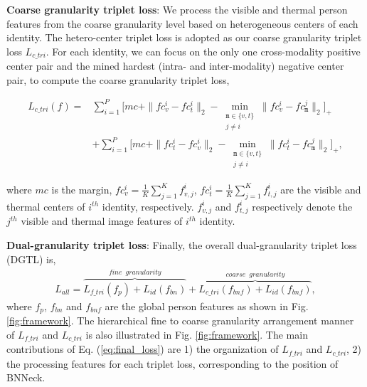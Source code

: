 \documentclass[journal]{IEEEtran}
\begin{document}
\textbf{Coarse granularity triplet loss}: We process the visible and thermal person features from the coarse granularity level based on heterogeneous centers of each identity. The hetero-center triplet loss \cite{Liu2020ParametersSE} is adopted as our coarse granularity triplet loss $L_{c\_tri}$. For each identity, we can focus on the only one cross-modality positive center pair and the mined hardest (intra- and inter-modality) negative center pair, to compute the coarse granularity triplet loss,
\begin{small}
\begin{align}\label{eq:loss_ct}
    L_{c\_tri}(f) = & \sum\limits_{i=1}^{P}\Big[mc  +  \|fc^i_v - fc^i_t\|_2  - \min\limits_{\substack{ \texttt{m} \in \{v, t\} \\ j \neq i}}  \| fc^i_v - fc^j_\texttt{m} \| _2 \Big]_+  \\
    & + \sum\limits_{i=1}^{P}\Big[mc  +  \|fc^i_t - fc^i_v\|_2  - \min\limits_{\substack{ \texttt{m} \in \{v, t\} \\ j \neq i}}  \| fc^i_t - fc^j_\texttt{m} \| _2 \Big]_+,\nonumber
\end{align}
\end{small}
where $mc$ is the margin, $fc_{v}^{i} = \frac{1}{K} \sum_{j=1}^{K} f_{v,j}^{i}$, $fc_{t}^{i} = \frac{1}{K} \sum_{j=1}^{K} f_{t,j}^{i}$ are the visible and thermal centers of $i^{th}$ identity, respectively. $f_{v,j}^{i}$ and $f_{t,j}^{i}$ respectively denote the $j^{th}$ visible and thermal image features of $i^{th}$ identity.


\textbf{Dual-granularity triplet loss}: Finally, the overall dual-granularity triplet loss (DGTL) is,
\begin{align}
    L_{all}  =   \overbrace{L_{f\_tri}(f_p) + L_{id}(f_{bn})}^{fine\,\,\,granularity} + \overbrace{L_{c\_tri}(f_{bnf}) + L_{id}(f_{bnf})}^{coarse\,\,\,granularity}, \label{eq:final_loss}
\end{align}
where $f_p$, $f_{bn}$ and $f_{bnf}$ are the global person features as shown in Fig. \ref{fig:framework}. The hierarchical fine to coarse granularity arrangement manner of $L_{f\_tri}$ and $L_{c\_tri}$ is also illustrated in Fig. \ref{fig:framework}. The main contributions of Eq. (\ref{eq:final_loss}) are 1) the organization of $L_{f\_tri}$ and $L_{c\_tri}$, 2) the processing features for each triplet loss, corresponding to the position of BNNeck.
\end{document}
